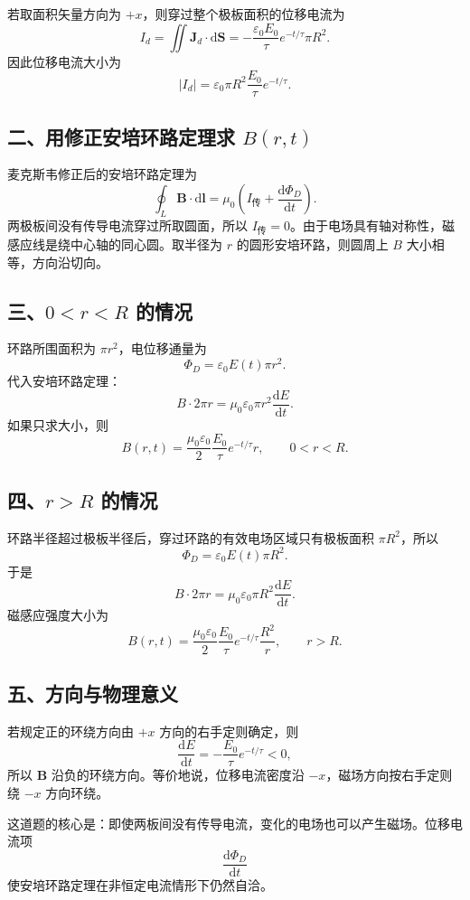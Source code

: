 \documentclass[11pt,a4paper]{ctexart}
\newcommand{\dd}{\mathrm{d}}
\begin{document}
若取面积矢量方向为 $+x$，则穿过整个极板面积的位移电流为
\[
  I_d=\iint \bm J_d\cdot \dd\bm S
  =-\frac{\varepsilon_0E_0}{\tau}e^{-t/\tau}\pi R^2 .
\]
因此位移电流大小为
\[
  \boxed{|I_d|
  =\varepsilon_0\pi R^2\frac{E_0}{\tau}e^{-t/\tau}.}
\]

\subsection*{二、用修正安培环路定理求 $B(r,t)$}

麦克斯韦修正后的安培环路定理为
\[
  \oint_L \bm B\cdot \dd\bm l
  =\mu_0\left(I_{\text{传}}+\frac{\dd\Phi_D}{\dd t}\right).
\]
两极板间没有传导电流穿过所取圆面，所以 $I_{\text{传}}=0$。由于电场具有轴对称性，磁感应线是绕中心轴的同心圆。取半径为 $r$ 的圆形安培环路，则圆周上 $B$ 大小相等，方向沿切向。

\subsection*{三、$0<r<R$ 的情况}

环路所围面积为 $\pi r^2$，电位移通量为
\[
  \Phi_D=\varepsilon_0E(t)\pi r^2.
\]
代入安培环路定理：
\[
  B\cdot 2\pi r
  =\mu_0\varepsilon_0\pi r^2\frac{\dd E}{\dd t}.
\]
如果只求大小，则
\[
  \boxed{
  B(r,t)=\frac{\mu_0\varepsilon_0}{2}
  \frac{E_0}{\tau}e^{-t/\tau}r,
  \qquad 0<r<R.}
\]

\subsection*{四、$r>R$ 的情况}

环路半径超过极板半径后，穿过环路的有效电场区域只有极板面积 $\pi R^2$，所以
\[
  \Phi_D=\varepsilon_0E(t)\pi R^2.
\]
于是
\[
  B\cdot 2\pi r
  =\mu_0\varepsilon_0\pi R^2\frac{\dd E}{\dd t}.
\]
磁感应强度大小为
\[
  \boxed{
  B(r,t)=\frac{\mu_0\varepsilon_0}{2}
  \frac{E_0}{\tau}e^{-t/\tau}\frac{R^2}{r},
  \qquad r>R.}
\]

\subsection*{五、方向与物理意义}

若规定正的环绕方向由 $+x$ 方向的右手定则确定，则
\[
  \frac{\dd E}{\dd t}
  =-\frac{E_0}{\tau}e^{-t/\tau}<0,
\]
所以 $\bm B$ 沿负的环绕方向。等价地说，位移电流密度沿 $-x$，磁场方向按右手定则绕 $-x$ 方向环绕。

这道题的核心是：即使两板间没有传导电流，变化的电场也可以产生磁场。位移电流项
\[
  \frac{\dd\Phi_D}{\dd t}
\]
使安培环路定理在非恒定电流情形下仍然自洽。
\end{document}
